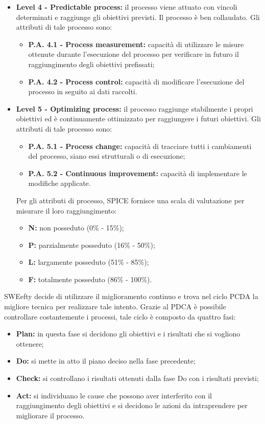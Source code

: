 \begin{itemize}
\begin{itemize}
		\end{itemize}
	\item \textbf{Level 4 - Predictable process:}
		il processo viene attuato con vincoli determinati  e  raggiunge  gli  obiettivi  previsti. Il processo è ben collaudato. Gli attributi di tale processo sono:
		\begin{itemize}
			\item \textbf{P.A. 4.1 - Process measurement:}
			capacità  di  utilizzare  le  misure ottenute durante l’esecuzione del processo per verificare in futuro il raggiungimento degli obiettivi prefissati;
			\item \textbf{P.A. 4.2 - Process control:}
			capacità  di  modificare  l’esecuzione  del processo in seguito ai dati raccolti.
		\end{itemize}
	\item \textbf{Level 5 - Optimizing process:}
		il processo raggiunge stabilmente i propri obiettivi ed è continuamente ottimizzato per raggiungere i futuri obiettivi.
		Gli attributi di tale processo sono:
		\begin{itemize}
			\item \textbf{P.A. 5.1 - Process change:}
			capacità di tracciare tutti i cambiamenti del processo, siano essi strutturali o di esecuzione;
			\item \textbf{P.A. 5.2 - Continuous improvement:}
			capacità di implementare le modifiche applicate.
		\end{itemize}

		Per gli attributi di processo, SPICE fornisce una scala di valutazione per misurare il loro raggiungimento:
		\begin{itemize}
			\item \textbf{N:} non posseduto (0\% - 15\%);
			\item \textbf{P:} parzialmente posseduto (16\% - 50\%);
			\item \textbf{L:} largamente posseduto (51\% - 85\%);
			\item \textbf{F:} totalmente posseduto (86\% - 100\%).
		\end{itemize}
\end{itemize}
	SWEefty decide di utilizzare il miglioramento continuo e trova nel ciclo PCDA la migliore tecnica per realizzare tale intento.
	Grazie al PDCA è possibile controllare costantemente i processi, tale ciclo è composto da quattro fasi:
	\begin{itemize}
		\item \textbf{Plan:} in questa fase si decidono gli obiettivi e i risultati che si vogliono ottenere;
		\item \textbf{Do:} si mette in atto il piano deciso nella fase precedente;	
		\item \textbf{Check:} si controllano i risultati ottenuti dalla fase Do con i risultati previsti;
		\item \textbf{Act:} si individuano le cause che possono aver interferito con il raggiungimento degli obiettivi e si decidono le azioni da intraprendere per migliorare il processo.
	\end{itemize}

